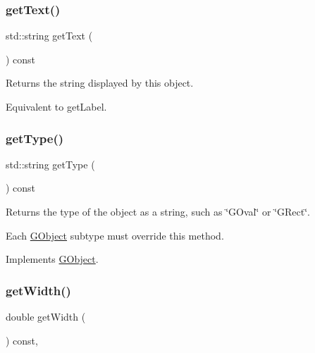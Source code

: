 \mbox{\label{classGText_aff553c50924b836c29f146ed34a7c6ec}} 
\subsubsection{\texorpdfstring{get\+Text()}{getText()}}
{\footnotesize\ttfamily std\+::string get\+Text (\begin{DoxyParamCaption}{ }\end{DoxyParamCaption}) const\hspace{0.3cm}{\ttfamily [virtual]}}



Returns the string displayed by this object. 

Equivalent to get\+Label. \mbox{\label{classGText_a9896d58fcfebbf1025aeeb5b8b9ede80}} 
\subsubsection{\texorpdfstring{get\+Type()}{getType()}}
{\footnotesize\ttfamily std\+::string get\+Type (\begin{DoxyParamCaption}{ }\end{DoxyParamCaption}) const\hspace{0.3cm}{\ttfamily [virtual]}}



Returns the type of the object as a string, such as {\ttfamily \char`\"{}\+G\+Oval\char`\"{}} or {\ttfamily \char`\"{}\+G\+Rect\char`\"{}}. 

Each \mbox{\hyperlink{classGObject}{G\+Object}} subtype must override this method. 

Implements \mbox{\hyperlink{classGObject_a799e073a127b428cc841086d42ea4fed}{G\+Object}}.

\mbox{\label{classGObject_a0ed2965abd4f5701d2cadf71239faf19}} 
\subsubsection{\texorpdfstring{get\+Width()}{getWidth()}}
{\footnotesize\ttfamily double get\+Width (\begin{DoxyParamCaption}{ }\end{DoxyParamCaption}) const\hspace{0.3cm}{\ttfamily [virtual]}, {\ttfamily [inherited]}}



